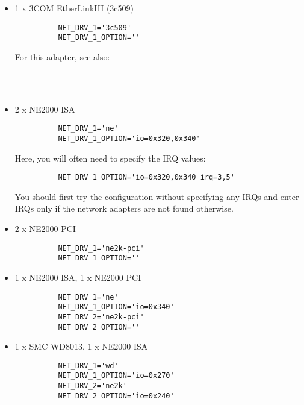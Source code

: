 \begin{description}
{\begin{itemize}
    \item  1 x 3COM EtherLinkIII (3c509)
\begin{example}
\begin{verbatim}
          NET_DRV_1='3c509'
          NET_DRV_1_OPTION=''
\end{verbatim}
\end{example}
      For this adapter, see also:

    \begin{raggedright}
      \\
      \\
      \par
    \end{raggedright}

    \item 2 x NE2000 ISA
\begin{example}
\begin{verbatim}
          NET_DRV_1='ne'
          NET_DRV_1_OPTION='io=0x320,0x340'
\end{verbatim}
\end{example}
      Here, you will often need to specify the IRQ values:

\begin{example}
\begin{verbatim}
          NET_DRV_1_OPTION='io=0x320,0x340 irq=3,5'
\end{verbatim}
\end{example}

      You should first try the configuration without specifying any IRQs
      and enter IRQs only if the network adapters are not found otherwise.

    \item 2 x NE2000 PCI
\begin{example}
\begin{verbatim}
          NET_DRV_1='ne2k-pci'
          NET_DRV_1_OPTION=''
\end{verbatim}
\end{example}
    \item  1 x NE2000 ISA, 1 x NE2000 PCI
\begin{example}
\begin{verbatim}
          NET_DRV_1='ne'
          NET_DRV_1_OPTION='io=0x340'
          NET_DRV_2='ne2k-pci'
          NET_DRV_2_OPTION=''
\end{verbatim}
\end{example}
    \item 1 x SMC WD8013, 1 x NE2000 ISA
\begin{example}
\begin{verbatim}
          NET_DRV_1='wd'
          NET_DRV_1_OPTION='io=0x270'
          NET_DRV_2='ne2k'
          NET_DRV_2_OPTION='io=0x240'
\end{verbatim}
\end{example}
    \end{itemize}

}
\end{description}

